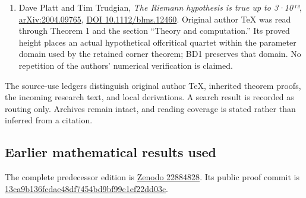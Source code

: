 \documentclass[11pt]{article}
\begin{document}
\begin{enumerate}
\item
  Dave Platt and Tim Trudgian, \emph{The Riemann hypothesis is true up to 3·10¹²}, \href{https://arxiv.org/abs/2004.09765}{arXiv:2004.09765}, \href{https://doi.org/10.1112/blms.12460}{DOI 10.1112/blms.12460}. Original author TeX was read through Theorem 1 and the section ``Theory and computation.'' Its proved height places an actual hypothetical offcritical quartet within the parameter domain used by the retained corner theorem; BD1 preserves that domain. No repetition of the authors' numerical verification is claimed.
\end{enumerate}

The source-use ledgers distinguish original author TeX, inherited theorem proofs, the incoming research text, and local derivations. A search result is recorded as routing only. Archives remain intact, and reading coverage is stated rather than inferred from a citation.

\subsection{Earlier mathematical results used}\label{earlier-mathematical-results-used}

The complete predecessor edition is \href{https://zenodo.org/records/22884828}{Zenodo 22884828}. Its public proof commit is \href{https://github.com/KokunoYumeto/zeta-function-research-reader/tree/13ca9b136fcdae48df7454bd9bf99e1ef22dd03c/workbenches/splitzero-tandem/continuations/20260922-original-growth-resolvent}{13ca9b136fcdae48df7454bd9bf99e1ef22dd03c}.
\end{document}

